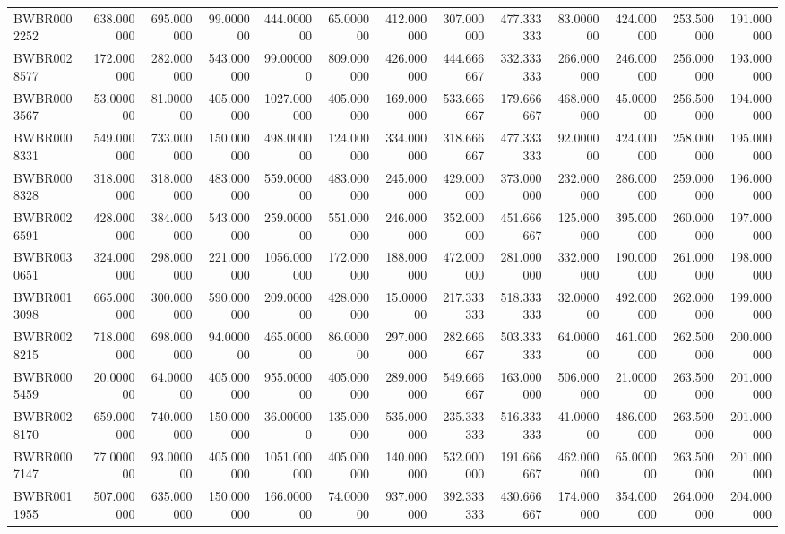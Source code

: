 \begin{longtable}{lrrrrrrrrrrrr}
BWBR0002252 & 638.000000 & 695.000000 & 99.000000 & 444.000000 & 65.000000 & 412.000000 & 307.000000 & 477.333333 & 83.000000 & 424.000000 & 253.500000 & 191.000000 \\
BWBR0028577 & 172.000000 & 282.000000 & 543.000000 & 99.000000 & 809.000000 & 426.000000 & 444.666667 & 332.333333 & 266.000000 & 246.000000 & 256.000000 & 193.000000 \\
BWBR0003567 & 53.000000 & 81.000000 & 405.000000 & 1027.000000 & 405.000000 & 169.000000 & 533.666667 & 179.666667 & 468.000000 & 45.000000 & 256.500000 & 194.000000 \\
BWBR0008331 & 549.000000 & 733.000000 & 150.000000 & 498.000000 & 124.000000 & 334.000000 & 318.666667 & 477.333333 & 92.000000 & 424.000000 & 258.000000 & 195.000000 \\
BWBR0008328 & 318.000000 & 318.000000 & 483.000000 & 559.000000 & 483.000000 & 245.000000 & 429.000000 & 373.000000 & 232.000000 & 286.000000 & 259.000000 & 196.000000 \\
BWBR0026591 & 428.000000 & 384.000000 & 543.000000 & 259.000000 & 551.000000 & 246.000000 & 352.000000 & 451.666667 & 125.000000 & 395.000000 & 260.000000 & 197.000000 \\
BWBR0030651 & 324.000000 & 298.000000 & 221.000000 & 1056.000000 & 172.000000 & 188.000000 & 472.000000 & 281.000000 & 332.000000 & 190.000000 & 261.000000 & 198.000000 \\
BWBR0013098 & 665.000000 & 300.000000 & 590.000000 & 209.000000 & 428.000000 & 15.000000 & 217.333333 & 518.333333 & 32.000000 & 492.000000 & 262.000000 & 199.000000 \\
BWBR0028215 & 718.000000 & 698.000000 & 94.000000 & 465.000000 & 86.000000 & 297.000000 & 282.666667 & 503.333333 & 64.000000 & 461.000000 & 262.500000 & 200.000000 \\
BWBR0005459 & 20.000000 & 64.000000 & 405.000000 & 955.000000 & 405.000000 & 289.000000 & 549.666667 & 163.000000 & 506.000000 & 21.000000 & 263.500000 & 201.000000 \\
BWBR0028170 & 659.000000 & 740.000000 & 150.000000 & 36.000000 & 135.000000 & 535.000000 & 235.333333 & 516.333333 & 41.000000 & 486.000000 & 263.500000 & 201.000000 \\
BWBR0007147 & 77.000000 & 93.000000 & 405.000000 & 1051.000000 & 405.000000 & 140.000000 & 532.000000 & 191.666667 & 462.000000 & 65.000000 & 263.500000 & 201.000000 \\
BWBR0011955 & 507.000000 & 635.000000 & 150.000000 & 166.000000 & 74.000000 & 937.000000 & 392.333333 & 430.666667 & 174.000000 & 354.000000 & 264.000000 & 204.000000 \\

\end{longtable}
